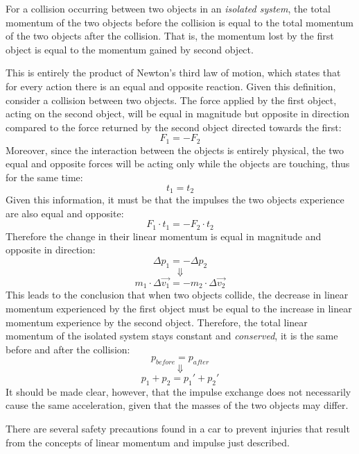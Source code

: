 \begin{displayquote}
	For a collision occurring between two objects in an \emph{isolated system}, the total momentum of the two objects before the collision is equal to the total momentum of the two objects after the collision. That is, the momentum lost by the first object is equal to the momentum gained by second object.
\end{displayquote}

This is entirely the product of Newton's third law of motion, which states that for every action there is an equal and opposite reaction. Given this definition, consider a collision between two objects. The force applied by the first object, acting on the second object, will be equal in magnitude but opposite in direction compared to the force returned by the second object directed towards the first: $$F_1 = -F_2$$ Moreover, since the interaction between the objects is entirely physical, the two equal and opposite forces will be acting only while the objects are touching, thus for the same time: $$t_1 = t_2$$ Given this information, it must be that the impulses the two objects experience are also equal and opposite: $$F_1 \cdot t_1 = -F_2 \cdot t_2$$ Therefore the change in their linear momentum is equal in magnitude and opposite in direction: $$\Delta p_1 = -\Delta p_2$$ $$\Downarrow$$ $$m_1 \cdot \Delta \vec{v_1} = -m_2 \cdot \Delta \vec{v_2}$$ This leads to the conclusion that when two objects collide, the decrease in linear momentum experienced by the first object must be equal to the increase in linear momentum experience by the second object. Therefore, the total linear momentum of the isolated system stays constant and \emph{conserved}, it is the same before and after the collision: $$p_{before} = p_{after}$$ $$\Downarrow$$ $$p_1 + p_2 = p_1' + p_2'$$ It should be made clear, however, that the impulse exchange does not necessarily cause the same acceleration, given that the masses of the two objects may differ.


There are several safety precautions found in a car to prevent injuries that result from the concepts of linear momentum and impulse just described. 


